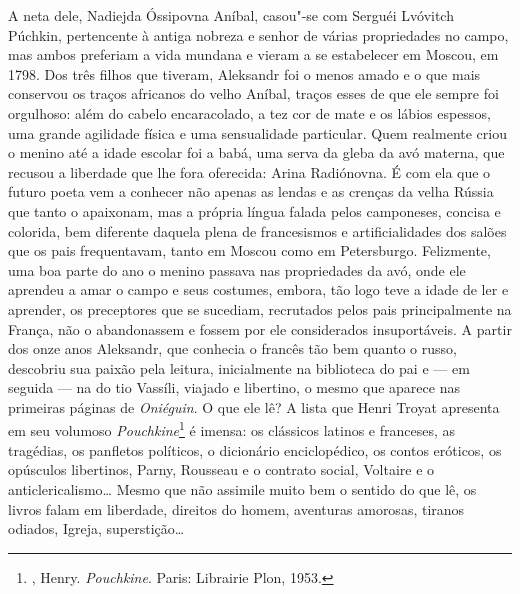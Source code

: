 A neta dele, Nadiejda Óssipovna Aníbal, casou"-se com Serguéi Lvóvitch
Púchkin, pertencente à antiga nobreza e senhor de várias
propriedades no campo, mas ambos preferiam a vida mundana e vieram a se
estabelecer em Moscou, em 1798. Dos três filhos que tiveram, Aleksandr
foi o menos amado e o que mais conservou os traços africanos do velho
Aníbal, traços esses de que ele sempre foi orgulhoso: além do cabelo
encaracolado, a tez cor de mate e os lábios espessos, uma grande
agilidade física e uma sensualidade particular. Quem realmente criou o
menino até a idade escolar foi a babá, uma serva da gleba da avó
materna, que recusou a liberdade que lhe fora oferecida: Arina
Radiónovna. É com ela que o futuro poeta vem a conhecer não apenas as
lendas e as crenças da velha Rússia que tanto o apaixonam, mas a própria
língua falada pelos camponeses, concisa e colorida, bem diferente
daquela plena de francesismos e artificialidades dos salões que os pais
frequentavam, tanto em Moscou como em Petersburgo. Felizmente, uma boa
parte do ano o menino passava nas propriedades da avó, onde ele aprendeu
a amar o campo e seus costumes, embora, tão logo teve a idade de ler e
aprender, os preceptores que se sucediam, recrutados pelos pais
principalmente na França, não o abandonassem e fossem por ele
considerados insuportáveis. A partir dos onze anos Aleksandr, que
conhecia o francês tão bem quanto o russo, descobriu sua paixão pela
leitura, inicialmente na biblioteca do pai e --- em seguida --- na do tio
Vassíli, viajado e libertino, o mesmo que aparece nas primeiras páginas
de \emph{Oniéguin}. O que ele lê? A lista que Henri Troyat apresenta em seu
volumoso \emph{Pouchkine}\footnote{, Henry. \emph{Pouchkine}. Paris: Librairie Plon, 1953.} é imensa: os clássicos latinos e franceses, as
tragédias, os panfletos políticos, o dicionário enciclopédico, os
contos eróticos, os opúsculos libertinos, Parny, Rousseau e o contrato
social, Voltaire e o anticlericalismo\ldots{} Mesmo que não assimile muito
bem o sentido do que lê, os livros falam em liberdade, direitos do
homem, aventuras amorosas, tiranos odiados, Igreja, superstição\ldots{}

